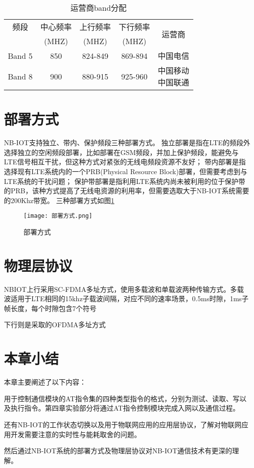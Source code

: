 \begin{table}[h!]
\caption{运营商band分配}
\begin{tabular}{ccccc}
\toprule
频段&中心频率&上行频率&下行频率&\multirow{2}{*}{运营商}\\
&(MHZ)&(MHZ)&(MHZ)&\\
\midrule
Band 5&850&824-849&869-894&中国电信\\
\midrule
Band 8&900&880-915&925-960&\makecell[c]{中国移动\\中国联通}\\
\bottomrule
\end{tabular}
\label{运营商band分配}
\end{table}


\section{部署方式}
NB-IOT支持独立、带内、保护频段三种部署方式。
独立部署是指在LTE的频段外选择独立的空闲频段部署，比如部署在GSM频段，并加上保护频段，能避免与LTE信号相互干扰，但这种方式对紧张的无线电频段资源不友好；
带内部署是指选择现有LTE系统内的一个PRB(Physical Resource Block)部署，但需要考虑到与LTE系统的干扰问题\cite{8436641}；
保护带部署是指利用LTE系统内尚未被利用的位于保护带的PRB，该种方式提高了无线电资源的利用率，但需要选取大于NB-IOT系统需要的200Khz带宽。
三种部署方式如图\ref{部署方式}

\begin{figure}[h]
	\centering
	\texttt{[image: 部署方式.png]}
	\caption{部署方式}
	\label{部署方式}
\end{figure}

\section{物理层协议}

NBIOT上行采用SC-FDMA多址方式，使用多载波和单载波两种传输方式。多载波适用于LTE相同的15khz子载波间隔，对应不同的速率场景，0.5ms时隙，1ms子帧长度，每个时隙包含7个符号

下行则是采取的OFDMA多址方式

\section{本章小结}

本章主要阐述了以下内容：

用于控制通信模块的AT指令集的四种类型指令的格式，分别为测试、读取、写以及执行指令。第四章实验部分将通过AT指令控制模块完成入网以及通信过程。

还有NB-IOT的工作状态切换以及用于物联网应用的应用层协议，了解对物联网应用开发需要注意的实时性与能耗取舍的问题。

然后通过NB-IOT系统的部署方式及物理层协议对NB-IOT通信技术有更深的理解。